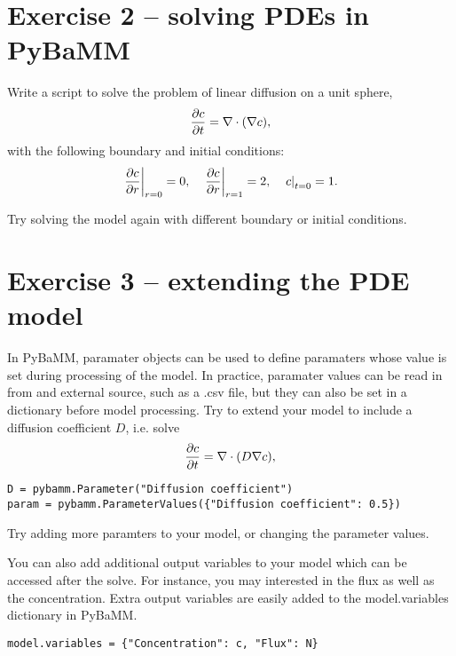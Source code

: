 \documentclass[a4paper,11pt]{article}
\begin{document}
\section*{Exercise 2 -- solving PDEs in PyBaMM}
Write a script to solve the problem of linear diffusion on a unit sphere,
\begin{equation*}
  \pdv{c}{t} = \nabla \cdot (\nabla c),
\end{equation*}
with the following boundary and initial conditions:
\begin{equation*}
  \left.\pdv{c}{r}\right\vert_{r=0} = 0, \quad \left.\pdv{c}{r}\right\vert_{r=1} = 2, \quad \left.c\right\vert_{t=0} = 1.
\end{equation*}

Try solving the model again with different boundary or initial conditions.

\section*{Exercise 3 -- extending the PDE model}
In PyBaMM, paramater objects can be used to define paramaters whose value is set during processing of the model. In practice, paramater values can be read in from and external source, such as a .csv file, but they can also be set in a dictionary before model processing. Try to extend your model to include a diffusion coefficient $D$, i.e. solve
\begin{equation*}
  \pdv{c}{t} = \nabla \cdot (D \nabla c),
\end{equation*}

\begin{lstlisting}[label={Ex3_parameter},caption=Adding a parameter and setting its value]
D = pybamm.Parameter("Diffusion coefficient")
param = pybamm.ParameterValues({"Diffusion coefficient": 0.5})
\end{lstlisting}

Try adding more paramters to your model, or changing the parameter values.

You can also add additional output variables to your model which can be accessed after the solve. For instance, you may interested in the flux as well as the concentration. Extra output variables are easily added to the model.variables dictionary in PyBaMM.

\begin{lstlisting}[label={Ex3_extra_vars},caption=Adding extra output variables]
model.variables = {"Concentration": c, "Flux": N}
\end{lstlisting}
\end{document}
